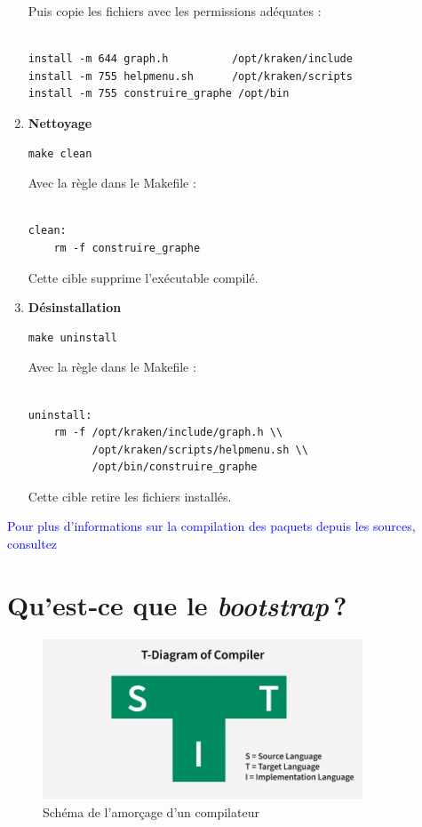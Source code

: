 \begin{enumerate}
\begin{verbatim}
    \end{verbatim}
Puis copie les fichiers avec les permissions adéquates :\\

  \begin{verbatim}

install -m 644 graph.h          /opt/kraken/include
install -m 755 helpmenu.sh      /opt/kraken/scripts
install -m 755 construire_graphe /opt/bin
    \end{verbatim}

  \item \textbf{Nettoyage}  
    \begin{verbatim}
make clean
    \end{verbatim}
    Avec la règle dans le Makefile :
    \begin{verbatim}

clean:
    rm -f construire_graphe
    \end{verbatim}
    Cette cible supprime l’exécutable compilé.

  \item \textbf{Désinstallation}  
    \begin{verbatim}
make uninstall
    \end{verbatim}
    Avec la règle dans le Makefile :
    \begin{verbatim}

uninstall:
    rm -f /opt/kraken/include/graph.h \\
          /opt/kraken/scripts/helpmenu.sh \\
          /opt/bin/construire_graphe
    \end{verbatim}
    Cette cible retire les fichiers installés.
\end{enumerate}

  





   
\textcolor{blue}{Pour plus d’informations sur la compilation des paquets depuis les sources, consultez} \cite{tutoriel_unix}

\section{Qu’est‑ce que le \emph{bootstrap} ?}
\label{subsec:bootstrap}
\begin{figure}[H]
  \centering
  \includegraphics[width=0.85\textwidth]{images_pfe/bootstrap.png}
  \caption{Schéma de l’amorçage d’un compilateur}
  \label{fig:bootstrap}
\end{figure}

